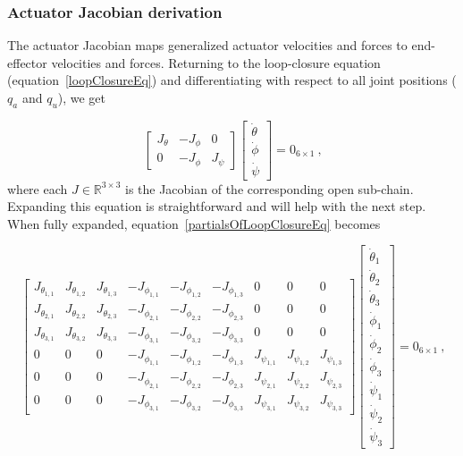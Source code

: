 \documentclass{report}
\begin{document}
\subsubsection[Actuator Jacobian derivation]{Actuator Jacobian derivation}
The actuator Jacobian maps generalized actuator velocities and forces to end-effector velocities and forces. Returning to the loop-closure equation (equation~\ref{loopClosureEq}) and differentiating with respect to all joint positions ($q_{a}$ and $q_{u}$), we get

\begin{equation} \label{partialsOfLoopClosureEq}
\begin{bmatrix}
J_{\theta} & -J_{\phi} & 0\\
0 & -J_{\phi} & J_{\psi}
\end{bmatrix}
\begin{bmatrix}
\dot{\theta}\\
\dot{\phi}\\
\dot{\psi}
\end{bmatrix} = 0_{6\times 1}\ \text{,}
\end{equation}
where each $J\in \mathbb{R}^{3\times 3}$ is the Jacobian of the corresponding open sub-chain. Expanding this equation is straightforward and will help with the next step. When fully expanded, equation~\ref{partialsOfLoopClosureEq} becomes

\begin{equation} \label{partialsOfLoopClosureEqExpanded}
\begin{bmatrix}
J_{\theta_{1,1}} & J_{\theta_{1,2}} & J_{\theta_{1,3}} & -J_{\phi_{1,1}} & -J_{\phi_{1,2}} & -J_{\phi_{1,3}} & 0 & 0 & 0\\
J_{\theta_{2,1}} & J_{\theta_{2,2}} & J_{\theta_{2,3}} & -J_{\phi_{2,1}} & -J_{\phi_{2,2}} & -J_{\phi_{2,3}} & 0 & 0 & 0\\
J_{\theta_{3,1}} & J_{\theta_{3,2}} & J_{\theta_{3,3}} & -J_{\phi_{3,1}} & -J_{\phi_{3,2}} & -J_{\phi_{3,3}} & 0 & 0 & 0\\
0 & 0 & 0 & -J_{\phi_{1,1}} & -J_{\phi_{1,2}} & -J_{\phi_{1,3}} & J_{\psi_{1,1}} & J_{\psi_{1,2}} & J_{\psi_{1,3}}\\
0 & 0 & 0 & -J_{\phi_{2,1}} & -J_{\phi_{2,2}} & -J_{\phi_{2,3}} & J_{\psi_{2,1}} & J_{\psi_{2,2}} & J_{\psi_{2,3}}\\
0 & 0 & 0 & -J_{\phi_{3,1}} & -J_{\phi_{3,2}} & -J_{\phi_{3,3}} & J_{\psi_{3,1}} & J_{\psi_{3,2}} & J_{\psi_{3,3}}
\end{bmatrix}
\begin{bmatrix}
\dot{\theta}_{1}\\
\dot{\theta}_{2}\\
\dot{\theta}_{3}\\
\dot{\phi}_{1}\\
\dot{\phi}_{2}\\
\dot{\phi}_{3}\\
\dot{\psi}_{1}\\
\dot{\psi}_{2}\\
\dot{\psi}_{3}
\end{bmatrix} = 0_{6\times 1}\ \text{,}
\end{equation}
\end{document}
